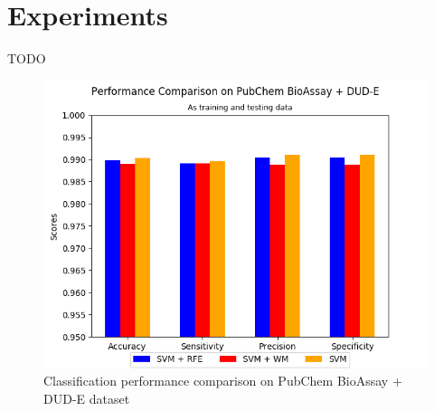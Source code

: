 \documentclass[conference,compsoc,12pt]{IEEEtran}
\begin{document}
\section{Experiments} \label{Experiments}

TODO

%
%

%
%


\begin{figure}
	\includegraphics[scale=0.5]{../images/03-evaluate-1_scores_chart.png}
	\caption{Classification performance comparison on PubChem BioAssay + DUD-E dataset}
	\label{fig_performance_comparison_pubchem}
\end{figure}
\end{document}
